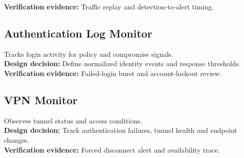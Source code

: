 \documentclass[10pt,letterpaper]{article}
\begin{document}
\textbf{Verification evidence:} Traffic replay and detection-to-alert timing.\\[3pt]
\subsection{Authentication Log Monitor}
Tracks login activity for policy and compromise signals.\\[4pt]
\textbf{Design decision:} Define normalized identity events and response thresholds.\\[3pt]
\textbf{Verification evidence:} Failed-login burst and account-lockout review.\\[3pt]
\subsection{VPN Monitor}
Observes tunnel status and access conditions.\\[4pt]
\textbf{Design decision:} Track authentication failures, tunnel health and endpoint changes.\\[3pt]
\textbf{Verification evidence:} Forced disconnect alert and availability trace.\\[3pt]
\end{document}
